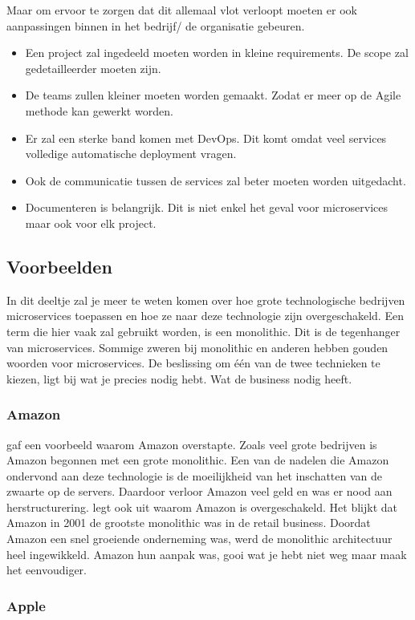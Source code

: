 Maar om ervoor te zorgen dat dit allemaal vlot verloopt moeten er ook aanpassingen binnen in het bedrijf/ de organisatie gebeuren. 
\begin{itemize}
	\item Een project zal ingedeeld moeten worden in kleine requirements. De scope zal gedetailleerder moeten zijn.
	\item De teams zullen kleiner moeten worden gemaakt. Zodat er meer op de Agile methode kan gewerkt worden. 
	\item Er zal een sterke band komen met DevOps. Dit komt omdat veel services volledige automatische deployment vragen.
	\item Ook de communicatie tussen de services zal beter moeten worden uitgedacht.
	\item Documenteren is belangrijk. Dit is niet enkel het geval voor microservices maar ook voor elk project.
\end{itemize}
\subsection{Voorbeelden}
In dit deeltje zal je meer te weten komen over hoe grote technologische bedrijven microservices toepassen en hoe ze naar deze technologie zijn overgeschakeld.
Een term die hier vaak zal gebruikt worden, is een monolithic. Dit is de tegenhanger van microservices. Sommige zweren bij monolithic en anderen hebben gouden woorden voor microservices. De beslissing om één van de twee technieken te kiezen, ligt bij wat je precies nodig hebt. Wat de business nodig heeft. 

\subsubsection{Amazon}
\textcite{Mauersberger2017} gaf een voorbeeld waarom Amazon overstapte. Zoals veel grote bedrijven is Amazon begonnen met een grote monolithic. Een van de nadelen die Amazon ondervond aan deze technologie is de moeilijkheid van het inschatten van de zwaarte op de servers. Daardoor verloor Amazon veel geld en was er nood aan herstructurering.
\textcite{Fulton2015} legt ook uit waarom Amazon is overgeschakeld. Het blijkt dat Amazon in 2001 de grootste monolithic was in de retail business. Doordat Amazon een snel groeiende onderneming was, werd de monolithic architectuur heel ingewikkeld. Amazon hun aanpak was, gooi wat je hebt niet weg maar maak het eenvoudiger. 
\subsubsection{Apple}
